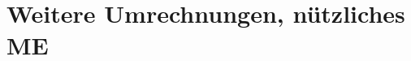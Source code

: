 \documentclass[numerate]{cheatsheet}
\begin{document}
%     
%     
%     
%     
%     

%     
%     
%     
%     
%     
%     

%     

\section{Weitere Umrechnungen, nützliches \hfill ME}
    
    
\end{document}
